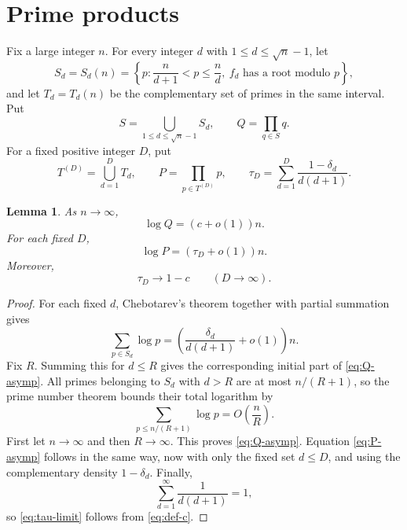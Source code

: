 \documentclass[11pt]{article}
\newtheorem{lemma}[theorem]{Lemma}
\begin{document}
\section{Prime products}

Fix a large integer $n$. For every integer $d$ with $1\leq d\leq\sqrt n-1$, let
\[
  S_d=S_d(n)
  =\left\{p:\frac{n}{d+1}<p\leq\frac nd,
                    \ f_d\text{ has a root modulo }p\right\},
\]
and let $T_d=T_d(n)$ be the complementary set of primes in the same interval. Put
\begin{equation}\label{eq:Q}
  S=\bigcup_{1\leq d\leq\sqrt n-1}S_d,
  \qquad
  Q=\prod_{q\in S}q.
\end{equation}
For a fixed positive integer $D$, put
\begin{equation}\label{eq:P}
  T^{(D)}=\bigcup_{d=1}^{D}T_d,
  \qquad
  P=\prod_{p\in T^{(D)}}p,
  \qquad
  \tau_D=\sum_{d=1}^{D}\frac{1-\delta_d}{d(d+1)}.
\end{equation}

\begin{lemma}\label{lem:products}
As $n\to\infty$,
\begin{equation}\label{eq:Q-asymp}
  \log Q=(c+o(1))n.
\end{equation}
For each fixed $D$,
\begin{equation}\label{eq:P-asymp}
  \log P=(\tau_D+o(1))n.
\end{equation}
Moreover,
\begin{equation}\label{eq:tau-limit}
  \tau_D\longrightarrow1-c
  \qquad(D\to\infty).
\end{equation}
\end{lemma}

\begin{proof}
For each fixed $d$, Chebotarev's theorem together with partial summation gives
\[
  \sum_{p\in S_d}\log p
  =\left(\frac{\delta_d}{d(d+1)}+o(1)\right)n.
\]
Fix $R$. Summing this for $d\leq R$ gives the corresponding initial part of \eqref{eq:Q-asymp}. All primes belonging to $S_d$ with $d>R$ are at most $n/(R+1)$, so the prime number theorem bounds their total logarithm by
\[
  \sum_{p\leq n/(R+1)}\log p=O\!\left(\frac nR\right).
\]
First let $n\to\infty$ and then $R\to\infty$. This proves \eqref{eq:Q-asymp}. Equation \eqref{eq:P-asymp} follows in the same way, now with only the fixed set $d\leq D$, and using the complementary density $1-\delta_d$. Finally,
\[
  \sum_{d=1}^{\infty}\frac1{d(d+1)}=1,
\]
so \eqref{eq:tau-limit} follows from \eqref{eq:def-c}.
\end{proof}
\end{document}
